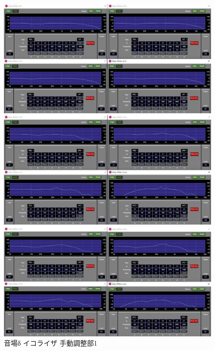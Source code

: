 \documentclass[11pt,a4j]{jreport}
\begin{document}
\begin{figure}[H]
  \begin{minipage}[b]{.5\linewidth}
    \centering
    \includegraphics[width=.9\linewidth]{images/experimentField/afcParameters/04delta/04manualEQ3.jpg}
  \end{minipage}%
  \begin{minipage}[b]{.5\linewidth}
    \centering
    \includegraphics[width=.9\linewidth]{images/experimentField/afcParameters/04delta/04manualEQ4.jpg}
  \end{minipage}

  \begin{minipage}[b]{1\linewidth}
    \centering
    \includegraphics[width=.45\linewidth]{images/experimentField/afcParameters/04delta/04manualEQ5.jpg}
  \end{minipage}

  \centering
  \caption{音場δ イコライザ 手動調整部1}
  \label{fig:deltaイコライザ手動調整部1}
\end{figure}
\end{document}

